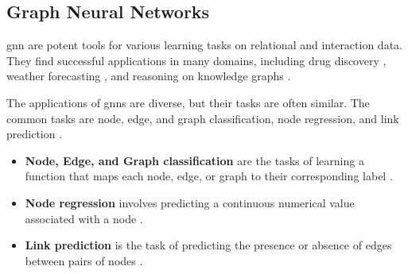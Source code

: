 

\newpage

\subsection{Graph Neural Networks}
\label{s_Background_GNNs}



\acrfull{gnn} are potent tools for various learning tasks on relational and interaction data. They find successful applications in many domains, including drug discovery \cite{dauparas_robust_2022}, weather forecasting \cite{lam_graphcast_2022}, and reasoning on knowledge graphs \cite{huang_few-shot_2022}. 



The applications of \glspl{gnn} are diverse, but their tasks are often similar. The common tasks are node, edge, and graph classification, node regression, and link prediction \cite{wu_comprehensive_2021, zhou_graph_2020}.
\begin{itemize}
    \item \textbf{Node, Edge, and Graph classification} are the tasks of learning a function that maps each node, edge, or graph to their corresponding label \cite{kipf_semi-supervised_2017}.
    \item \textbf{Node regression} involves predicting a continuous numerical value associated with a node \cite{wu_comprehensive_2021}.
    \item \textbf{Link prediction} is the task of predicting the presence or absence of edges between pairs of nodes \cite{liben-nowell_link-prediction_2007}.
\end{itemize}

